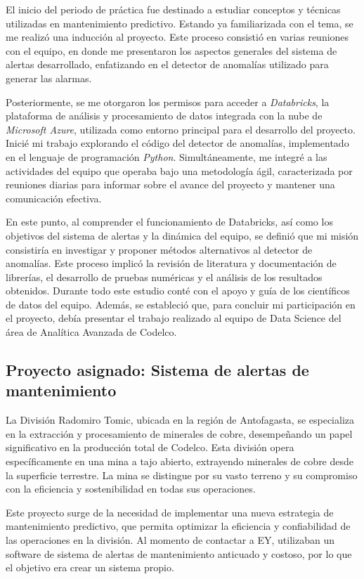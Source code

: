 \documentclass{article}[14pts]
\begin{document}
  El inicio del periodo de práctica fue destinado a estudiar conceptos y técnicas utilizadas en mantenimiento 
  predictivo. Estando ya familiarizada con el tema, se me realizó una inducción al proyecto. Este proceso consistió 
  en varias reuniones con el equipo, en donde me presentaron los aspectos generales del sistema de alertas
  desarrollado, enfatizando en el detector de anomalías utilizado para generar las alarmas. 

  Posteriormente, se me otorgaron los permisos para acceder a \textit{Databricks}, la plataforma de análisis y 
  procesamiento de datos integrada con la nube de \textit{Microsoft Azure}, utilizada como entorno principal para el desarrollo del proyecto. Inicié mi trabajo explorando el código del detector de anomalías, implementado en el 
  lenguaje de programación \textit{Python}. Simultáneamente, me integré a las actividades del equipo que operaba bajo una metodología ágil, caracterizada por reuniones diarias para informar sobre el avance del proyecto y mantener una comunicación efectiva.

  En este punto, al comprender el funcionamiento de Databricks, así como los objetivos del sistema de alertas y la dinámica del equipo, se definió que mi misión consistiría en investigar y proponer métodos alternativos al detector de anomalías. Este proceso implicó la revisión de literatura y documentación de librerías, el desarrollo de pruebas numéricas y el análisis de los resultados obtenidos. Durante todo este estudio conté con el apoyo y guía de los científicos de datos del equipo. Además, se estableció que, para concluir mi participación en el proyecto, debía presentar el trabajo realizado al equipo de Data Science del área de Analítica Avanzada de Codelco.

  \subsection{Proyecto asignado: Sistema de alertas de mantenimiento}

  La División Radomiro Tomic, ubicada en la región de Antofagasta, se especializa en la extracción y procesamiento de minerales de cobre, desempeñando un papel significativo en la producción total de Codelco. Esta división opera específicamente en una mina a tajo abierto, extrayendo minerales de cobre desde la superficie terrestre. La mina se distingue por su vasto terreno y su compromiso con la eficiencia y sostenibilidad en todas sus operaciones.

  Este proyecto surge de la necesidad de implementar una nueva estrategia de mantenimiento predictivo, que permita 
  optimizar la eficiencia y confiabilidad de las operaciones en la división. Al momento de contactar a EY, utilizaban un software de sistema de alertas de mantenimiento anticuado y costoso, por lo que el objetivo era crear un sistema propio. 
\end{document}
